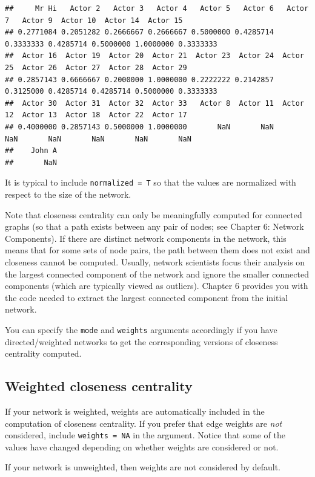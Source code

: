 \documentclass[
]{book}
\begin{document}
\begin{verbatim}
##     Mr Hi   Actor 2   Actor 3   Actor 4   Actor 5   Actor 6   Actor 7   Actor 9  Actor 10  Actor 14  Actor 15 
## 0.2771084 0.2051282 0.2666667 0.2666667 0.5000000 0.4285714 0.3333333 0.4285714 0.5000000 1.0000000 0.3333333 
##  Actor 16  Actor 19  Actor 20  Actor 21  Actor 23  Actor 24  Actor 25  Actor 26  Actor 27  Actor 28  Actor 29 
## 0.2857143 0.6666667 0.2000000 1.0000000 0.2222222 0.2142857 0.3125000 0.4285714 0.4285714 0.5000000 0.3333333 
##  Actor 30  Actor 31  Actor 32  Actor 33   Actor 8  Actor 11  Actor 12  Actor 13  Actor 18  Actor 22  Actor 17 
## 0.4000000 0.2857143 0.5000000 1.0000000       NaN       NaN       NaN       NaN       NaN       NaN       NaN 
##    John A 
##       NaN
\end{verbatim}

It is typical to include \texttt{normalized\ =\ T} so that the values are normalized with respect to the size of the network.

Note that closeness centrality can only be meaningfully computed for connected graphs (so that a path exists between any pair of nodes; see Chapter 6: Network Components). If there are distinct network components in the network, this means that for some sets of node pairs, the path between them does not exist and closeness cannot be computed. Usually, network scientists focus their analysis on the largest connected component of the network and ignore the smaller connected components (which are typically viewed as outliers). Chapter 6 provides you with the code needed to extract the largest connected component from the initial network.

You can specify the \texttt{mode} and \texttt{weights} arguments accordingly if you have directed/weighted networks to get the corresponding versions of closeness centrality computed.

\subsection{Weighted closeness centrality}\label{weighted-closeness-centrality}

If your network is weighted, weights are automatically included in the computation of closeness centrality. If you prefer that edge weights are \emph{not} considered, include \texttt{weights\ =\ NA} in the argument. Notice that some of the values have changed depending on whether weights are considered or not.

If your network is unweighted, then weights are not considered by default.
\end{document}
